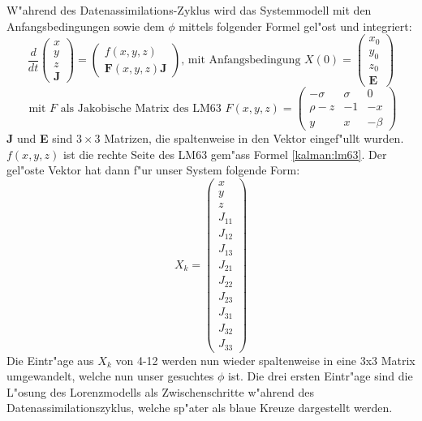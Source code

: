 \begin{refsection}
W"ahrend des Datenassimilations-Zyklus wird das Systemmodell mit den Anfangsbedingungen sowie dem $\phi$ mittels folgender Formel gel"ost und integriert:
\[
\frac{d}{dt}\begin{pmatrix}
x \\ 
y \\ 
z \\ 
\textbf{J}
\end{pmatrix}=
\begin{pmatrix}
f(x,y,z) \\ 
\textbf{F}(x,y,z)\textbf{J}
\end{pmatrix} 
\text{, mit Anfangsbedingung }
X(0)=\begin{pmatrix}
x_{0}\\
y_{0}\\
z_{0}\\ 
\textbf{E}
\end{pmatrix} 
\]
\[
\text{ mit $F$ als Jakobische Matrix des LM63 }F(x,y,z) = \begin{pmatrix}
-\sigma & \sigma & 0 \\ 
\rho-z & -1 & -x \\ 
y & x & -\beta
\end{pmatrix} 
\]
\textbf{J} und \textbf{E} sind $3\times3$ Matrizen, die spaltenweise in den Vektor eingef"ullt wurden. $f(x,y,z)$ ist die rechte Seite des LM63 gem"ass Formel \eqref{kalman:lm63}. Der gel"oste Vektor hat dann f"ur unser System folgende Form:
\[
X_{k}=\begin{pmatrix}
x \\ 
y \\ 
z \\  
J_{11} \\ 
J_{12} \\ 
J_{13} \\ 
J_{21} \\ 
J_{22} \\ 
J_{23} \\ 
J_{31} \\ 
J_{32} \\
J_{33} 
\end{pmatrix}
\]
Die Eintr"age aus $X_{k}$ von 4-12 werden nun wieder spaltenweise in eine 3x3 Matrix umgewandelt, welche nun unser gesuchtes $\phi$ ist. Die drei ersten Eintr"age sind die L"osung des Lorenzmodells als Zwischenschritte w"ahrend des Datenassimilationszyklus, welche sp"ater als blaue Kreuze dargestellt werden. \cite{skript:DiffGl}\\


\end{refsection}
